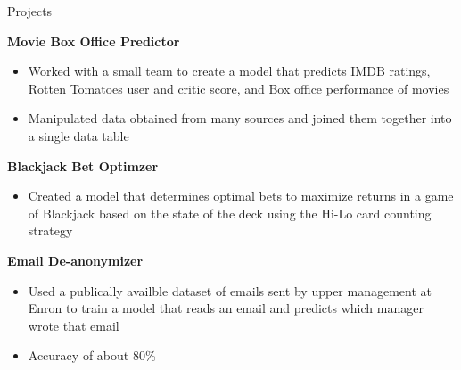 \documentclass[12pt]{resumeclass}
\begin{document}
\vspace{12pt}
\resumesect
    {Projects}
    {\textbf{Movie Box Office Predictor}
    {\begin{itemize}[noitemsep,nolistsep]
	\item Worked with a small team to create a model that predicts IMDB ratings, Rotten Tomatoes user and critic score, and Box office performance of movies
	\item Manipulated data obtained from many sources and joined them together into a single data table
    \end{itemize}}


    \vspace{3pt}
    \textbf{Blackjack Bet Optimzer}
    {\begin{itemize}[noitemsep,nolistsep]
	\item Created a model that determines optimal bets to maximize returns in a game of Blackjack based on the state of the deck using the Hi-Lo card counting strategy
    \end{itemize}}


    \vspace{3pt}
    \textbf{Email De-anonymizer}
    {\begin{itemize}[noitemsep,nolistsep]
	\item Used a publically availble dataset of emails sent by upper management at Enron to train a model that reads an email and predicts which manager wrote that email
	\item Accuracy of about 80\%
    \end{itemize}}}
\end{document}
